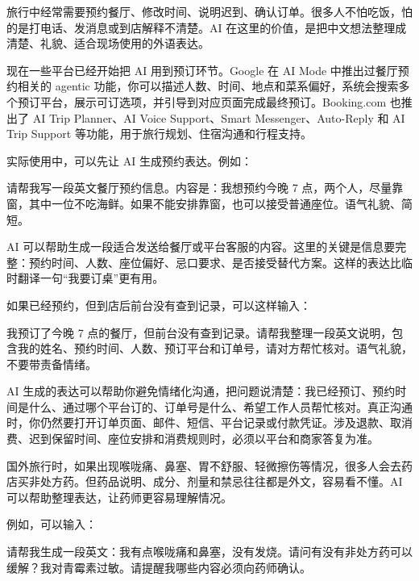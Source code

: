 
旅行中经常需要预约餐厅、修改时间、说明迟到、确认订单。很多人不怕吃饭，怕的是打电话、发消息或到店解释不清楚。AI 在这里的价值，是把中文想法整理成清楚、礼貌、适合现场使用的外语表达。

现在一些平台已经开始把 AI 用到预订环节。Google 在 AI Mode 中推出过餐厅预约相关的 agentic 功能，你可以描述人数、时间、地点和菜系偏好，系统会搜索多个预订平台，展示可订选项，并引导到对应页面完成最终预订。Booking.com 也推出了 AI Trip Planner、AI Voice Support、Smart Messenger、Auto-Reply 和 AI Trip Support 等功能，用于旅行规划、住宿沟通和行程支持。

实际使用中，可以先让 AI 生成预约表达。例如：

\begin{tcolorbox}[promptbox]
请帮我写一段英文餐厅预约信息。内容是：我想预约今晚 7 点，两个人，尽量靠窗，其中一位不吃海鲜。如果不能安排靠窗，也可以接受普通座位。语气礼貌、简短。
\end{tcolorbox}

AI 可以帮助生成一段适合发送给餐厅或平台客服的内容。这里的关键是信息要完整：预约时间、人数、座位偏好、忌口要求、是否接受替代方案。这样的表达比临时翻译一句“我要订桌”更有用。

如果已经预约，但到店后前台没有查到记录，可以这样输入：

\begin{tcolorbox}[promptbox]
我预订了今晚 7 点的餐厅，但前台没有查到记录。请帮我整理一段英文说明，包含我的姓名、预约时间、人数、预订平台和订单号，请对方帮忙核对。语气礼貌，不要带责备情绪。
\end{tcolorbox}

AI 生成的表达可以帮助你避免情绪化沟通，把问题说清楚：我已经预订、预约时间是什么、通过哪个平台订的、订单号是什么、希望工作人员帮忙核对。真正沟通时，你仍然要打开订单页面、邮件、短信、平台记录或付款凭证。涉及退款、取消费、迟到保留时间、座位安排和消费规则时，必须以平台和商家答复为准。


国外旅行时，如果出现喉咙痛、鼻塞、胃不舒服、轻微擦伤等情况，很多人会去药店买非处方药。但药品说明、成分、剂量和禁忌往往都是外文，容易看不懂。AI 可以帮助整理表达，让药师更容易理解情况。

例如，可以输入：

\begin{tcolorbox}[promptbox]
请帮我生成一段英文：我有点喉咙痛和鼻塞，没有发烧。请问有没有非处方药可以缓解？我对青霉素过敏。请提醒我哪些内容必须向药师确认。
\end{tcolorbox}

